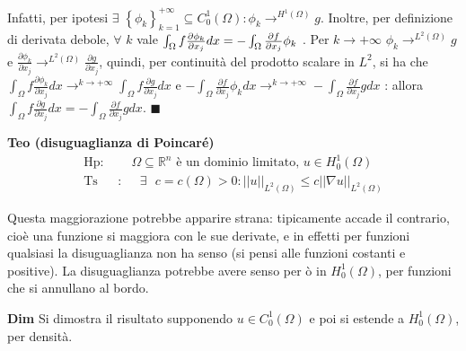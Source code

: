 \documentclass{article}
\begin{document}
Infatti, per ipotesi $\exists $ $\left\{ \phi _{k}\right\} _{k=1}^{+\infty
}\subseteq C_{0}^{1}\left( \Omega \right) :\phi _{k}\rightarrow
^{H^{1}\left( \Omega \right) }g$. Inoltre, per definizione di derivata
debole, $\forall $ $k$ vale $\int_{\Omega }f\frac{\partial \phi _{k}}{%
\partial x_{j}}dx=-\int_{\Omega }\frac{\partial f}{\partial x_{j}}\phi _{k}$%
. Per $k\rightarrow +\infty $ $\phi _{k}\rightarrow ^{L^{2}\left( \Omega
\right) }g$ e $\frac{\partial \phi _{k}}{\partial x_{j}}\rightarrow
^{L^{2}\left( \Omega \right) }\frac{\partial g}{\partial x_{j}}$, quindi,
per continuit\`{a} del prodotto scalare in $L^{2}$, si ha che $\int_{\Omega
}f\frac{\partial \phi _{k}}{\partial x_{j}}dx\rightarrow ^{k\rightarrow
+\infty }\int_{\Omega }f\frac{\partial g}{\partial x_{j}}dx$ e $%
-\int_{\Omega }\frac{\partial f}{\partial x_{j}}\phi _{k}dx\rightarrow
^{k\rightarrow +\infty }-\int_{\Omega }\frac{\partial f}{\partial x_{j}}gdx$%
: allora $\int_{\Omega }f\frac{\partial g}{\partial x_{j}}dx=-\int_{\Omega }%
\frac{\partial f}{\partial x_{j}}gdx$. $\blacksquare $

\textbf{Teo (disuguaglianza di Poincar\'{e})}%
\begin{eqnarray*}
\text{Hp}\text{: } &&\Omega \subseteq 
\mathbb{R}
^{n}\text{ \`{e} un dominio limitato, }u\in H_{0}^{1}\left( \Omega \right) \\
\text{Ts} &\text{:}&\text{ }\exists \text{ }c=c\left( \Omega \right)
>0:\left\vert \left\vert u\right\vert \right\vert _{L^{2}\left( \Omega
\right) }\leq c\left\vert \left\vert \nabla u\right\vert \right\vert
_{L^{2}\left( \Omega \right) }
\end{eqnarray*}

Questa maggiorazione potrebbe apparire strana: tipicamente accade il
contrario, cio\`{e} una funzione si maggiora con le sue derivate, e in
effetti per funzioni qualsiasi la disuguaglianza non ha senso (si pensi alle
funzioni costanti e positive). La disuguaglianza potrebbe avere senso per%
\`{o} in $H_{0}^{1}\left( \Omega \right) $, per funzioni che si annullano al
bordo.

\textbf{Dim} Si dimostra il risultato supponendo $u\in C_{0}^{1}\left(
\Omega \right) $ e poi si estende a $H_{0}^{1}\left( \Omega \right) $, per
densit\`{a}.
\end{document}
